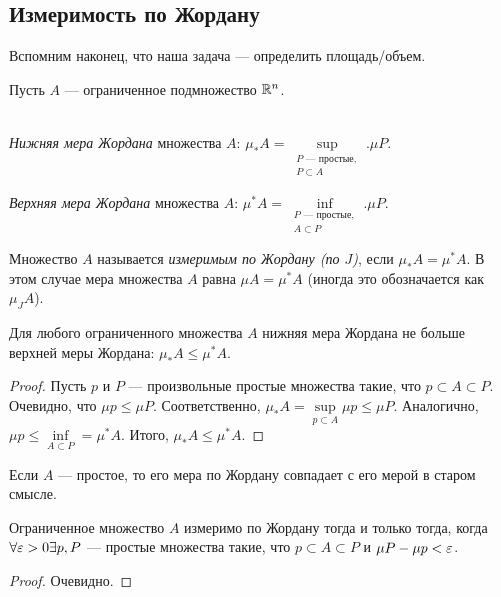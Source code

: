 \subsection{Измеримость по Жордану}

Вспомним наконец, что наша задача --- определить площадь/объем.

Пусть $A$ --- ограниченное подмножество $\mathbb{R}^n$.

\begin{Def}\ \\
\textit{Нижняя мера Жордана} множества $A$: $\mu_*A = \sup\limits_{\substack{P \text{ --- простые},\\ P \subset A}}. \mu P$.

\textit{Верхняя мера Жордана} множества $A$: $\mu^*A = \inf\limits_{\substack{P \text{ --- простые},\\ A \subset P}}. \mu P$.
\end{Def}

\begin{Def}
Множество $A$ называется \textit{измеримым по Жордану (по $J$)}, если $\mu_*A = \mu^*A$. В этом случае мера множества $A$ равна $\mu A = \mu^*A$ (иногда это обозначается как $\mu_J A$).
\end{Def}

\begin{Statement}
Для любого ограниченного множества $A$ нижняя мера Жордана не больше верхней меры Жордана: $\mu_*A \leq \mu^*A$.
\end{Statement}
\begin{proof}
Пусть $p$ и $P$ --- произвольные простые множества такие, что $p \subset A \subset P$. Очевидно, что $\mu p \leq \mu P$. Соответственно, $\mu_* A = \sup\limits_{p \subset A} \mu p \leq \mu P$. Аналогично, $\mu p \leq \inf\limits_{A \subset P} = \mu^* A$. Итого, $\mu_* A \leq \mu^* A$.
\end{proof}

\begin{Statement}
Если $A$ --- простое, то его мера по Жордану совпадает с его мерой в старом смысле.
\end{Statement}

\begin{Statement}
Ограниченное множество $A$ измеримо по Жордану тогда и только тогда, когда $\forall \varepsilon > 0 \exists p, P$ --- простые множества такие, что $p \subset A \subset P$ и $\mu P - \mu p < \varepsilon$.
\end{Statement}
\begin{proof}
Очевидно.
\end{proof}

